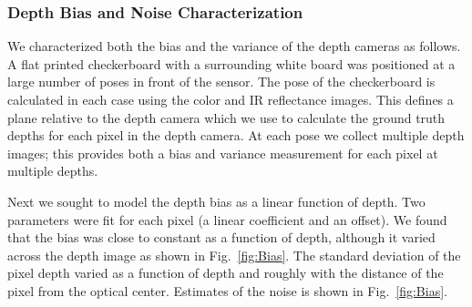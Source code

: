 \subsubsection{Depth Bias and Noise Characterization}
\label{sec:bias}

We characterized both the bias and the variance of the depth cameras as follows.  A flat printed checkerboard with a surrounding white board was positioned at a large number of poses in front of the sensor.  The pose of the checkerboard is calculated in each case using the color and IR reflectance images.  This defines a plane relative to the depth camera which we use to calculate the ground truth depths for each pixel in the depth camera.  At each pose we collect multiple depth images; this provides both a bias and variance measurement for each pixel at multiple depths.

Next we sought to model the depth bias as a linear function of depth.  Two parameters were fit for each pixel (a linear coefficient and an offset).  We found that the bias was close to constant as a function of depth, although it varied across the depth image as shown in Fig.~\ref{fig:Bias}.  The standard deviation of the pixel depth varied as a function of depth and roughly with the distance of the pixel from the optical center.  Estimates of the noise is shown in Fig.~\ref{fig:Bias}.

